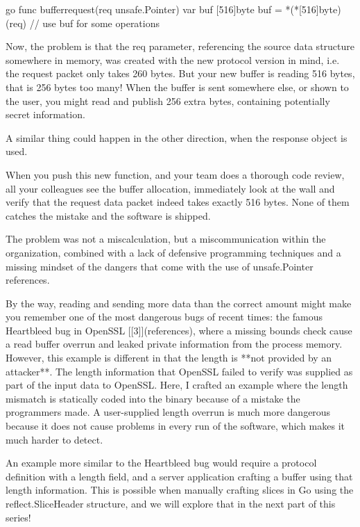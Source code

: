 go
func bufferrequest(req unsafe.Pointer) 
    var buf [516]byte
    buf = *(*[516]byte)(req)
    // use buf for some operations



Now, the problem is that the req parameter, referencing the source data structure somewhere in memory, was created
with the new protocol version in mind, i.e. the request packet only takes 260 bytes. But your new buffer is reading
516 bytes, that is 256 bytes too many! When the buffer is sent somewhere else, or shown to the user, you might read
and publish 256 extra bytes, containing potentially secret information.

A similar thing could happen in the other direction, when the response object is used.

When you push this new function, and your team does a thorough code review, all your colleagues see the buffer allocation,
immediately look at the wall and verify that the request data packet indeed takes exactly 516 bytes. None of them catches
the mistake and the software is shipped.

The problem was not a miscalculation, but a miscommunication within the organization, combined with a lack of defensive
programming techniques and a missing mindset of the dangers that come with the use of unsafe.Pointer references.

By the way, reading and sending more data than the correct amount might make you remember one of the most dangerous bugs
of recent times: the famous Heartbleed bug in OpenSSL [[3]](references), where a missing bounds check cause a read
buffer overrun and leaked private information from the process memory. However, this example is different in that the
length is **not provided by an attacker**. The length information that OpenSSL failed to verify was supplied as part of
the input data to OpenSSL. Here, I crafted an example where the length mismatch is statically coded into the binary
because of a mistake the programmers made. A user-supplied length overrun is much more dangerous because it does not
cause problems in every run of the software, which makes it much harder to detect.

An example more similar to the Heartbleed bug would require a protocol definition with a length field, and a server
application crafting a buffer using that length information. This is possible when manually crafting slices in Go using
the reflect.SliceHeader structure, and we will explore that in the next part of this series!


